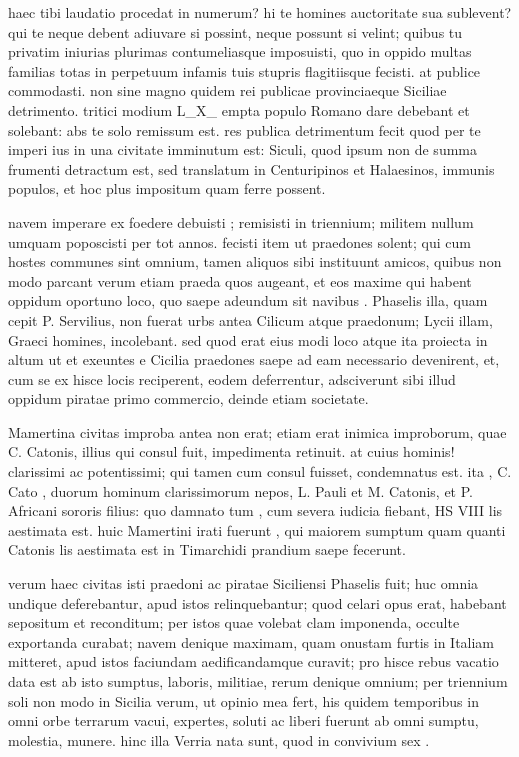  haec tibi laudatio procedat in numerum? hi te homines auctoritate sua sublevent? qui te neque debent adiuvare si possint, neque possunt si velint; quibus tu privatim iniurias plurimas contumeliasque imposuisti, quo in oppido multas familias totas in perpetuum infamis tuis stupris flagitiisque fecisti. at publice commodasti. non sine magno quidem rei publicae provinciaeque Siciliae detrimento. tritici modium L_X_ empta populo Romano dare debebant et solebant: abs te solo remissum est. res publica detrimentum fecit quod per te imperi ius in una civitate imminutum est: Siculi, quod ipsum non de summa frumenti detractum est, sed translatum in Centuripinos et Halaesinos, immunis populos, et hoc plus impositum quam ferre possent.

 navem imperare ex foedere debuisti ; remisisti in triennium; militem nullum umquam poposcisti per tot annos. fecisti item ut praedones solent; qui cum hostes communes sint omnium, tamen aliquos sibi instituunt amicos, quibus non modo parcant verum etiam praeda quos augeant, et eos maxime qui habent oppidum oportuno loco, quo saepe adeundum sit navibus . Phaselis illa, quam cepit P. Servilius, non fuerat urbs antea Cilicum atque praedonum; Lycii illam, Graeci homines, incolebant. sed quod erat eius modi loco atque ita proiecta in altum ut et exeuntes e Cicilia praedones saepe ad eam necessario devenirent, et, cum se ex hisce locis reciperent, eodem deferrentur, adsciverunt sibi illud oppidum piratae primo commercio, deinde etiam societate.

 Mamertina civitas improba antea non erat; etiam erat inimica improborum, quae C. Catonis, illius qui consul fuit, impedimenta retinuit. at cuius hominis! clarissimi ac potentissimi; qui tamen cum consul fuisset, condemnatus est. ita , C. Cato , duorum hominum clarissimorum nepos, L. Pauli et M. Catonis, et P. Africani sororis filius: quo damnato tum , cum severa iudicia fiebant, HS VIII lis aestimata est. huic Mamertini irati fuerunt , qui maiorem sumptum quam quanti Catonis lis aestimata est in Timarchidi prandium saepe fecerunt.

 verum haec civitas isti praedoni ac piratae Siciliensi Phaselis fuit; huc omnia undique deferebantur, apud istos relinquebantur; quod celari opus erat, habebant sepositum et reconditum; per istos quae volebat clam imponenda, occulte exportanda curabat; navem denique maximam, quam onustam furtis in Italiam mitteret, apud istos faciundam aedificandamque curavit; pro hisce rebus vacatio data est ab isto sumptus, laboris, militiae, rerum denique omnium; per triennium soli non modo in Sicilia verum, ut opinio mea fert, his quidem temporibus in omni orbe terrarum vacui, expertes, soluti ac liberi fuerunt ab omni sumptu, molestia, munere. hinc illa Verria nata sunt, quod in convivium sex .

